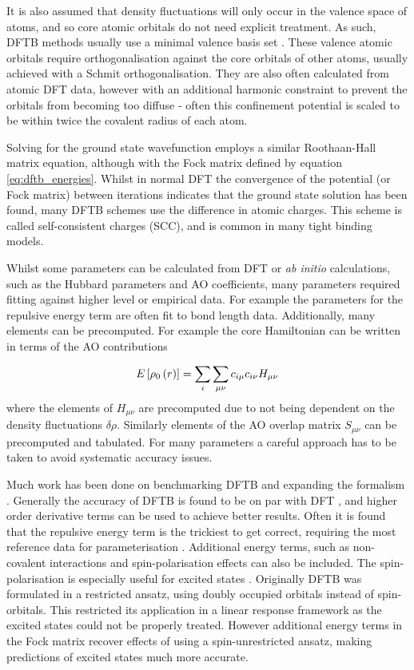 It is also assumed that density fluctuations will only occur in the valence space
of atoms, and so core atomic orbitals do not need explicit treatment. As such, DFTB
methods usually use a minimal valence basis set \cite{Bannwarth2020}. These valence
atomic orbitals require orthogonalisation against the core orbitals of other atoms,
usually achieved with a Schmit orthogonalisation. They are also often calculated
from atomic DFT data, however with an additional harmonic constraint to prevent
the orbitals from becoming too diffuse - often this confinement potential is scaled 
to be within twice the covalent radius of each atom.

Solving for the ground state wavefunction employs a similar Roothaan-Hall matrix
equation, although with the Fock matrix defined by equation \ref{eq:dftb_energies}.
Whilst in normal DFT the convergence of the potential (or Fock matrix) between iterations
indicates that the ground state solution has been found, many DFTB schemes use the
difference in atomic charges. This scheme is called self-consistent charges (SCC),
and is common in many tight binding models.

Whilst some parameters can be calculated from DFT or \emph{ab initio} calculations,
such as the Hubbard parameters and AO coefficients, many parameters required fitting
against higher level or empirical data. For example the parameters for the repulsive
energy term are often fit to bond length data. Additionally, many elements can be
precomputed. For example the core Hamiltonian can be written in terms of the AO
contributions 

\begin{equation}
    E_{} \left[ \rho_0\left(r\right) \right] = \sum_i \sum_{\mu\nu} c_{i\mu}c_{i\nu} H_{\mu\nu}
\end{equation}
%
where the elements of $H_{\mu\nu}$ are precomputed due to not being dependent on
the density fluctuations $\delta \rho$. Similarly elements of the AO overlap matrix
$S_{\mu\nu}$ can be precomputed and tabulated. For many parameters a careful approach
has to be taken to avoid systematic accuracy issues.

Much work has been done on benchmarking DFTB and expanding the formalism \cite{Koskinen2009, Goldman2012, AndreaRozzi2004, Kohler2005, Niehaus2005, Han2000}. 
Generally the accuracy of DFTB is found to be on par with DFT \cite{Lutsker2015, Gruden2017, Vuong2018},
and higher order derivative terms can be used to achieve better results. Often it
is found that the repulsive energy term is the trickiest to get correct, requiring 
the most reference data for parameterisation \cite{Koskinen2009}. Additional energy 
terms, such as non-covalent interactions and spin-polarisation effects can also 
be included. The spin-polarisation is especially useful for excited states \cite{Melix2016}. 
Originally DFTB was formulated in a restricted ansatz, using doubly occupied orbitals 
instead of spin-orbitals. This restricted its application in a linear response framework 
as the excited states could not be properly treated. However additional energy terms 
in the Fock matrix recover effects of using a spin-unrestricted ansatz, making predictions
of excited states much more accurate.

